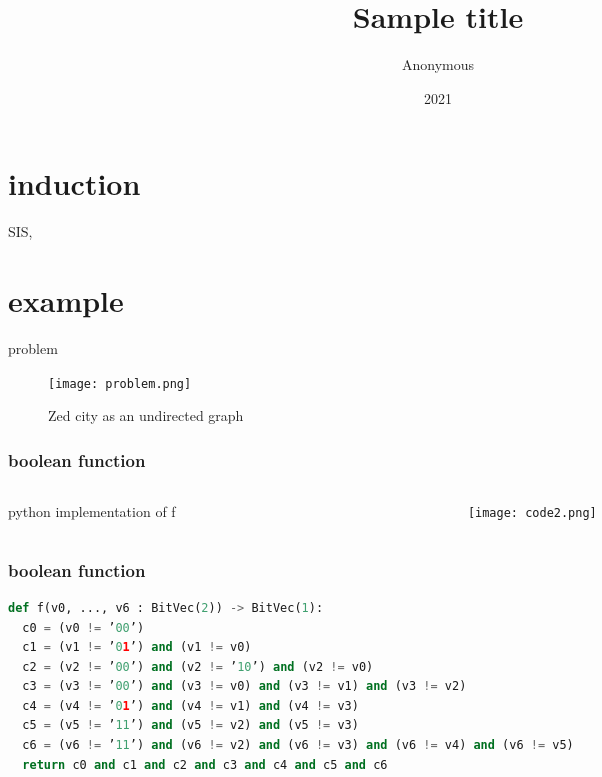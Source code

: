 \documentclass[aspectratio=1610]{beamer}
\title{Sample title}
\author{Anonymous}
\institute{Overleaf}
\date{2021}
\begin{document}
\begin{frame}[plain]
  \titlepage
\end{frame}
\section{induction}
\begin{frame}
  SIS, 
\end{frame}

\section{example}
\begin{frame}{problem}
  \begin{figure}[htbq]
    \centering
    \texttt{[image: problem.png]}
    \caption{Zed city as an undirected graph} 
    \label{fig-zed}
  \end{figure}
\end{frame}
\begin{frame}
  \frametitle{boolean function}
  \begin{columns}
    \begin{column}{0.5\linewidth}
      \begin{block}{python implementation of f }
        
      \end{block}
    \end{column}
    \begin{column}{0.5\linewidth}
      \begin{figure}[htbq]
        \centering
        \texttt{[image: code2.png]}
      \end{figure}
    \end{column}
  \end{columns}
\end{frame}
\begin{frame}[fragile]
  \frametitle{boolean function}
  \begin{lstlisting}[language=Python]
def f(v0, ..., v6 : BitVec(2)) -> BitVec(1):
  c0 = (v0 != ’00’)
  c1 = (v1 != ’01’) and (v1 != v0)
  c2 = (v2 != ’00’) and (v2 != ’10’) and (v2 != v0)
  c3 = (v3 != ’00’) and (v3 != v0) and (v3 != v1) and (v3 != v2)
  c4 = (v4 != ’01’) and (v4 != v1) and (v4 != v3)
  c5 = (v5 != ’11’) and (v5 != v2) and (v5 != v3)
  c6 = (v6 != ’11’) and (v6 != v2) and (v6 != v3) and (v6 != v4) and (v6 != v5)
  return c0 and c1 and c2 and c3 and c4 and c5 and c6
  \end{lstlisting}
\end{frame}
\end{document}
